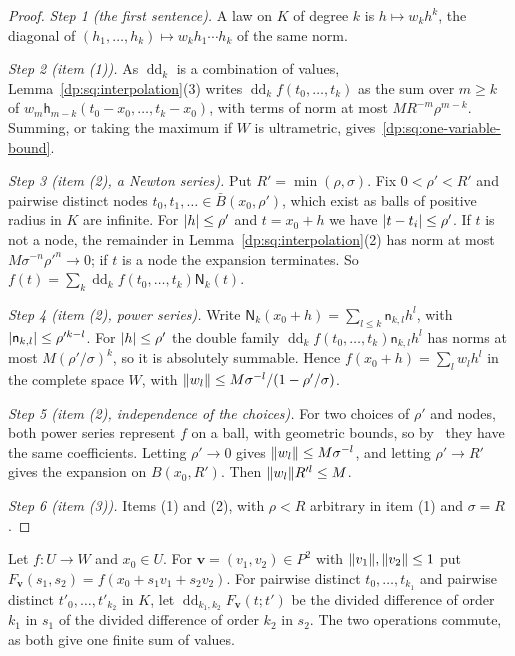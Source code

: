 \begin{proof}
\emph{Step 1 (the first sentence).} A law on $K$ of degree $k$ is $h\mapsto w_kh^k$, the diagonal of $(h_1,\dots,h_k)\mapsto w_kh_1\cdots h_k$ of the same norm.

\emph{Step 2 (item (1)).} As $\operatorname{dd}_k$ is a combination of values, Lemma~\ref{dp:sq:interpolation}(3) writes $\operatorname{dd}_kf(t_0,\dots,t_k)$ as the sum over $m\ge k$ of $w_m\mathsf h_{m-k}(t_0-x_0,\dots,t_k-x_0)$, with terms of norm at most $MR^{-m}\rho^{m-k}$. Summing, or taking the maximum if $W$ is ultrametric, gives~\eqref{dp:sq:one-variable-bound}.

\emph{Step 3 (item (2), a Newton series).} Put $R'=\min(\rho,\sigma)$. Fix $0<\rho'<R'$ and pairwise distinct nodes $t_0,t_1,\dots\in\bar B(x_0,\rho')$, which exist as balls of positive radius in $K$ are infinite. For $\lvert h\rvert\le\rho'$ and $t=x_0+h$ we have $\lvert t-t_i\rvert\le\rho'$. If $t$ is not a node, the remainder in Lemma~\ref{dp:sq:interpolation}(2) has norm at most $M\sigma^{-n}\rho'^n\to0$; if $t$ is a node the expansion terminates. So $f(t)=\sum_k\operatorname{dd}_kf(t_0,\dots,t_k)\mathsf N_k(t)$.

\emph{Step 4 (item (2), power series).} Write $\mathsf N_k(x_0+h)=\sum_{l\le k}\mathsf n_{k,l}h^l$, with $\lvert \mathsf n_{k,l}\rvert\le\rho'^{k-l}$. For $\lvert h\rvert\le\rho'$ the double family $\operatorname{dd}_kf(t_0,\dots,t_k)\mathsf n_{k,l}h^l$ has norms at most $M(\rho'/\sigma)^k$, so it is absolutely summable. Hence $f(x_0+h)=\sum_lw_lh^l$ in the complete space $W$, with $\lVert w_l\rVert\le M\sigma^{-l}/(1-\rho'/\sigma)$.

\emph{Step 5 (item (2), independence of the choices).} For two choices of $\rho'$ and nodes, both power series represent $f$ on a ball, with geometric bounds, so by~\cite[Lemma~A.1]{I} they have the same coefficients. Letting $\rho'\to0$ gives $\lVert w_l\rVert\le M\sigma^{-l}$, and letting $\rho'\to R'$ gives the expansion on $B(x_0,R')$. Then $\lVert w_l\rVert R'^l\le M$.

\emph{Step 6 (item (3)).} Items (1) and (2), with $\rho<R$ arbitrary in item (1) and $\sigma=R$.
\end{proof}

Let $f\colon U\to W$ and $x_0\in U$. For $\mathbf v=(v_1,v_2)\in P^2$ with $\lVert v_1\rVert,\lVert v_2\rVert\le1$ put $F_{\mathbf v}(s_1,s_2)=f(x_0+s_1v_1+s_2v_2)$. For pairwise distinct $t_0,\dots,t_{k_1}$ and pairwise distinct $t'_0,\dots,t'_{k_2}$ in $K$, let $\operatorname{dd}_{k_1,k_2}F_{\mathbf v}(t;t')$ be the divided difference of order $k_1$ in $s_1$ of the divided difference of order $k_2$ in $s_2$. The two operations commute, as both give one finite sum of values.

